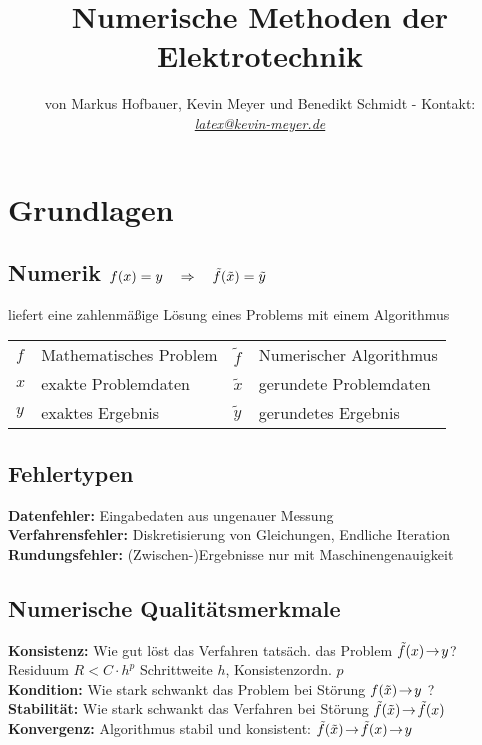 \documentclass[german]{latex4ei/latex4ei_sheet}
\title{Numerische Methoden der Elektrotechnik}
\author{von Markus Hofbauer, Kevin Meyer und Benedikt Schmidt - Kontakt:  \href{mailto:latex@kevin-meyer.de}{\textit{latex@kevin-meyer.de}}}
\begin{document}


\maketitle

\section{Grundlagen}
\begin{sectionbox}
	\subsection[Numerik]{Numerik $f(x) = y \quad \Rightarrow \quad \tilde f(\tilde x) = \tilde y$}
	liefert eine zahlenmäßige Lösung eines Problems mit einem Algorithmus\\[-1em]
	\begin{symbolbox}
		\begin{tabular*}{\columnwidth}{@{\ }l@{\ }l@{\qquad}l@{\ }l@{}}
			$f$ & Mathematisches Problem & $\tilde f$ & Numerischer Algorithmus\\
			$x$ & exakte Problemdaten & $\tilde x$ & gerundete Problemdaten\\
			$y$ & exaktes Ergebnis & $\tilde y$ & gerundetes Ergebnis\\
		\end{tabular*}
	\end{symbolbox}

	\subsection{Fehlertypen}
	\textbf{Datenfehler:} Eingabedaten aus ungenauer Messung\\
	\textbf{Verfahrensfehler:} Diskretisierung von Gleichungen, Endliche Iteration\\
	\textbf{Rundungsfehler:} (Zwischen-)Ergebnisse nur mit Maschinengenauigkeit

	\subsection{Numerische Qualitätsmerkmale}
	\textbf{Konsistenz:} Wie gut löst das Verfahren tatsäch. das Problem $\tilde f(x)\!\rightarrow\!y$?\\
	Residuum $R < C \cdot h^p$ \quad Schrittweite $h$, Konsistenzordn. $p$\\
	\textbf{Kondition:} Wie stark schwankt das Problem bei Störung $f(\tilde x)\!\rightarrow\!y$ ?\\[0.1em]
	\textbf{Stabilität:} Wie stark schwankt das Verfahren bei Störung $\tilde f(\tilde x)\!\rightarrow\!\tilde f(x)$
	\textbf{Konvergenz:} Algorithmus stabil und konsistent:  $\tilde f(\tilde x)\!\rightarrow\!\tilde f(x)\!\rightarrow\!y$
\end{sectionbox}
\end{document}
